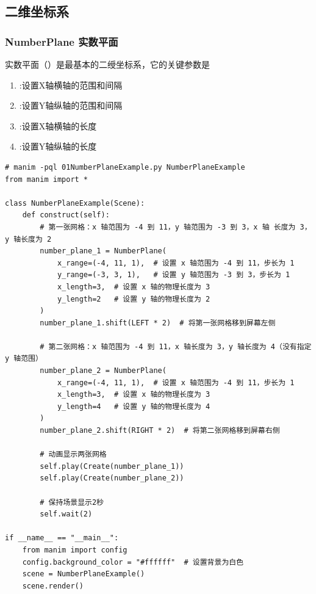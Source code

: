 \subsection{二维坐标系}
\label{subsec:Manim基本图形-二维坐标系}
\subsubsection{NumberPlane 实数平面}
\label{subsubsec:Manim基本图形-实数平面}
实数平面（）是最基本的二绶坐标系，它的关键参数是
\begin{enumerate}[label=\arabic*)]
    \item {}:设置\textcolor{YBXPurple}{X轴}横轴的范围和间隔
    \item {}:设置\textcolor{YBXPurple}{Y轴}纵轴的范围和间隔
    \item {}:设置\textcolor{YBXPurple}{X轴}横轴的长度
    \item {}:设置\textcolor{YBXPurple}{Y轴}纵轴的长度
\end{enumerate}

\begin{lstlisting}[style=pythonstyle]
# manim -pql 01NumberPlaneExample.py NumberPlaneExample
from manim import *

class NumberPlaneExample(Scene):
    def construct(self):
        # 第一张网格：x 轴范围为 -4 到 11，y 轴范围为 -3 到 3，x 轴 长度为 3，y 轴长度为 2
        number_plane_1 = NumberPlane(
            x_range=(-4, 11, 1),  # 设置 x 轴范围为 -4 到 11，步长为 1
            y_range=(-3, 3, 1),   # 设置 y 轴范围为 -3 到 3，步长为 1
            x_length=3,  # 设置 x 轴的物理长度为 3
            y_length=2   # 设置 y 轴的物理长度为 2
        )
        number_plane_1.shift(LEFT * 2)  # 将第一张网格移到屏幕左侧

        # 第二张网格：x 轴范围为 -4 到 11，x 轴长度为 3，y 轴长度为 4（没有指定 y 轴范围）
        number_plane_2 = NumberPlane(
            x_range=(-4, 11, 1),  # 设置 x 轴范围为 -4 到 11，步长为 1
            x_length=3,  # 设置 x 轴的物理长度为 3
            y_length=4   # 设置 y 轴的物理长度为 4
        )
        number_plane_2.shift(RIGHT * 2)  # 将第二张网格移到屏幕右侧

        # 动画显示两张网格
        self.play(Create(number_plane_1))
        self.play(Create(number_plane_2))

        # 保持场景显示2秒
        self.wait(2)

if __name__ == "__main__":
    from manim import config
    config.background_color = "#ffffff"  # 设置背景为白色
    scene = NumberPlaneExample()
    scene.render()
\end{lstlisting}      

